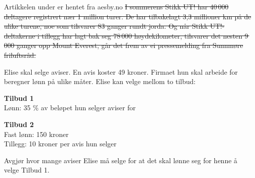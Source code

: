 Artikkelen under er hentet fra aesby.no
\st{
I sommerens Stikk UT! har 40\,000 deltagere registrert nær
1 million turer. De har tilbakelagt 3,3 millioner km på de
ulike turene, noe som tilsvarer 83 ganger rundt jorda. Og når
Stikk UT!-deltakerne i tillegg har lagt bak seg
78\,000 høydekilometer, tilsvarer det nesten 9\,000 ganger opp
Mount Everest, går det frem av ei pressemelding fra
Sunnmøre friluftsråd.
}

Elise skal selge aviser. En avis koster 49 kroner. Firmaet hun skal arbeide for beregner lønn på ulike måter. Elise kan velge mellom to tilbud:

\begin{center}
	\textbf{Tilbud 1}\\
	Lønn: 35 \% av beløpet hun selger aviser for
\end{center}

\begin{center}
	\textbf{Tilbud 2}\\
	Fast lønn: 150 kroner\\
	Tillegg: 10 kroner per avis hun selger
\end{center}
Avgjør hvor mange aviser Elise må selge for at det skal lønne seg for henne å velge Tilbud 1.


